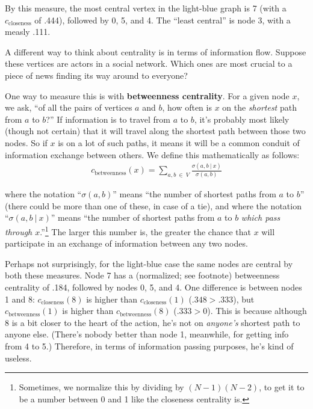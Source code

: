By this measure, the most central vertex in the light-blue graph is 7 (with a
$c_{\textrm{closeness}}$ of .444), followed by 0, 5, and 4. The ``least
central'' is node 3, with a measly .111.

\bigskip

A different way to think about centrality is in terms of information flow.
Suppose these vertices are actors in a social network. Which ones are most
crucial to a piece of news finding its way around to everyone? 


One way to measure this is with \textbf{betweenness centrality}. For a given
node $x$, we ask, ``of all the pairs of vertices $a$ and $b$, how often is $x$
on the \textit{shortest} path from $a$ to $b$?'' If information is to travel
from $a$ to $b$, it's probably most likely (though not certain) that it will
travel along the shortest path between those two nodes. So if $x$ is on a lot
of such paths, it means it will be a common conduit of information exchange
between others. We define this mathematically as follows:
\begin{align*}
c_{\textrm{betweenness}}(x) = \sum_{a,b\ \in\ V} \frac{\sigma(a,b\ |\ x)}{\sigma(a,b)}
\end{align*}

where the notation ``$\sigma(a,b)$'' means ``the number of shortest paths from
$a$ to $b$'' (there could be more than one of these, in case of a tie), and
where the notation ``$\sigma(a,b\ |\ x)$'' means ``the number of shortest paths
from $a$ to $b$ \textit{which pass through $x$}.''\footnote{Sometimes, we
normalize this by dividing by $(N-1)(N-2)$, to get it to be a number between 0
and 1 like the closeness centrality is.} The larger this number is, the
greater the chance that $x$ will participate in an exchange of information
between any two nodes.


Perhaps not surprisingly, for the light-blue case the same nodes are central
by both these measures. Node 7 has a (normalized; see footnote) betweenness
centrality of .184, followed by nodes 0, 5, and 4. One difference is between
nodes 1 and 8: $c_{\textrm{closeness}}(8)$ is higher than
$c_{\textrm{closeness}}(1)$ ($.348 > .333$), but $c_{\textrm{betweenness}}(1)$
is higher than $c_{\textrm{betweenness}}(8)$ ($.333 > 0$). This is because
although 8 is a bit closer to the heart of the action, he's not on
\textit{anyone's} shortest path to anyone else. (There's nobody better than
node 1, meanwhile, for getting info from 4 to 5.) Therefore, in terms of
information passing purposes, he's kind of useless.


